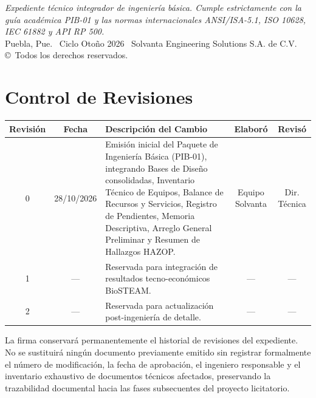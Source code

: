 \documentclass[10pt,letterpaper]{article}
\begin{document}
\begin{titlepage}
    \vfill
    {\footnotesize \textit{Expediente técnico integrador de ingeniería básica. Cumple estrictamente con la guía académica PIB-01 y las normas internacionales ANSI/ISA-5.1, ISO 10628, IEC 61882 y API RP 500.}\\
    Puebla, Pue. \textbar\ Ciclo Otoño 2026 \textbar\ Solvanta Engineering Solutions S.A. de C.V. \copyright\ Todos los derechos reservados.}
\end{titlepage}

\section*{Control de Revisiones}

\begin{table}[H]
\centering\small
\setlength{\tabcolsep}{6pt}
\renewcommand{\arraystretch}{1.2}
\begin{tabularx}{\textwidth}{c c X c c}
\toprule
\rowcolor{tableheader}
\color{white}\textbf{Revisión} & \color{white}\textbf{Fecha} & \color{white}\textbf{Descripción del Cambio} & \color{white}\textbf{Elaboró} & \color{white}\textbf{Revisó} \\
\midrule
0 & 28/10/2026 & Emisión inicial del Paquete de Ingeniería Básica (PIB-01), integrando Bases de Diseño consolidadas, Inventario Técnico de Equipos, Balance de Recursos y Servicios, Registro de Pendientes, Memoria Descriptiva, Arreglo General Preliminar y Resumen de Hallazgos HAZOP. & Equipo Solvanta & Dir. Técnica \\
1 & --- & Reservada para integración de resultados tecno-económicos BioSTEAM. & --- & --- \\
2 & --- & Reservada para actualización post-ingeniería de detalle. & --- & --- \\
\bottomrule
\end{tabularx}
\end{table}

\begin{tcolorbox}[colframe=ambercolor,colback=boxbg,arc=2mm,boxrule=1pt,title=\textbf{Advertencia Técnica Oficial}]
\small
La firma conservará permanentemente el historial de revisiones del expediente. No se sustituirá ningún documento previamente emitido sin registrar formalmente el número de modificación, la fecha de aprobación, el ingeniero responsable y el inventario exhaustivo de documentos técnicos afectados, preservando la trazabilidad documental hacia las fases subsecuentes del proyecto licitatorio.
\end{tcolorbox}
\end{document}
